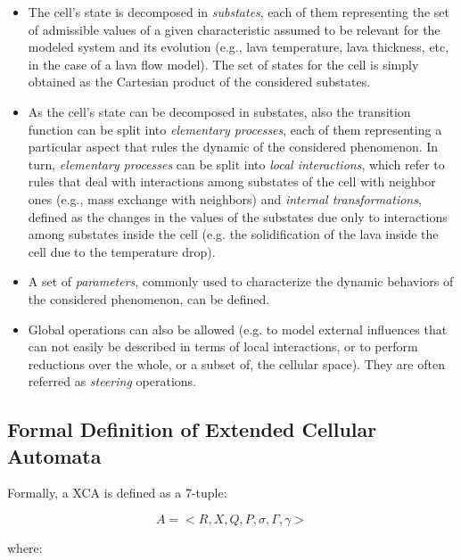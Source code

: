 \begin{itemize}

\item The cell's state is decomposed in \emph{substates}, each of them
  representing the set of admissible values of a given characteristic
  assumed to be relevant for the modeled system and its evolution
  (e.g., lava temperature, lava thickness, etc, in the case of a lava
  flow model). The set of states for the cell is simply obtained as
  the Cartesian product of the considered substates.

\item As the cell's state can be decomposed in substates, also the
  transition function can be split into \emph{elementary processes},
  each of them representing a particular aspect that rules the dynamic
  of the considered phenomenon. In turn, \emph{elementary processes}
  can be split into \emph{local interactions}, which refer to rules
  that deal with interactions among substates of the cell with
  neighbor ones (e.g., mass exchange with neighbors) and
  \emph{internal transformations}, defined as the changes in the
  values of the substates due only to interactions among substates
  inside the cell (e.g. the solidification of the lava inside the cell
  due to the temperature drop).

\item A set of \emph{parameters}, commonly used to characterize the
  dynamic behaviors of the considered phenomenon, can be defined.

\item Global operations can also be allowed (e.g. to model external
  influences that can not easily be described in terms of local
  interactions, or to perform reductions over the whole, or a subset
  of, the cellular space). They are often referred as \emph{steering}
  operations.

\end{itemize}


\subsection{Formal Definition of Extended Cellular Automata}


Formally, a XCA is defined as a 7-tuple:

$$ A = <R,X,Q,P,\sigma,\Gamma,\gamma>$$

\noindent where:

